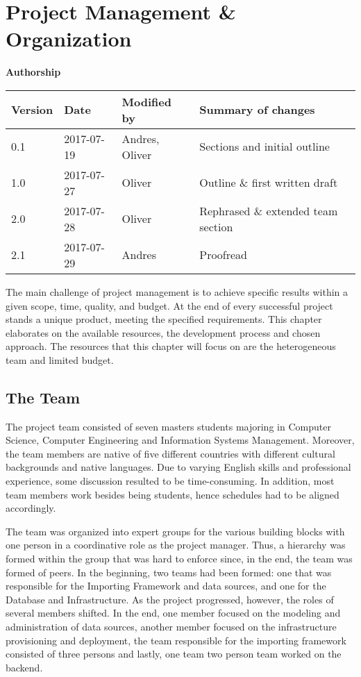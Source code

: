 \section{Project Management \& Organization}\label{sec:organization}

\textbf{Authorship}

\begin{longtable}[]{@{}llll@{}}
\toprule
Version & Date & Modified by & Summary of changes\tabularnewline
\midrule
\endhead
0.1 & 2017-07-19 & Andres, Oliver & Sections and initial
outline\tabularnewline
1.0 & 2017-07-27 & Oliver & Outline \& first written
draft\tabularnewline
2.0 & 2017-07-28 & Oliver & Rephrased \& extended team
section\tabularnewline
2.1 & 2017-07-29 & Andres & Proofread\tabularnewline
\bottomrule
\end{longtable}

The main challenge of project management is to achieve specific results
within a given scope, time, quality, and budget. At the end of every
successful project stands a unique product, meeting the specified
requirements. This chapter elaborates on the available resources, the
development process and chosen approach. The resources that this chapter
will focus on are the heterogeneous team and limited budget.

\subsection{The Team}\label{the-team}

The project team consisted of seven masters students majoring in
Computer Science, Computer Engineering and Information Systems
Management. Moreover, the team members are native of five different
countries with different cultural backgrounds and native languages. Due
to varying English skills and professional experience, some discussion
resulted to be time-consuming. In addition, most team members work besides
being students, hence schedules had to be aligned accordingly.

The team was organized into expert groups for the various building
blocks with one person in a coordinative role as the project manager.
Thus, a hierarchy was formed within the group that was hard to enforce
since, in the end, the team was formed of peers. In the beginning, two
teams had been formed: one that was responsible for the Importing
Framework and data sources, and one for the Database and Infrastructure.
As the project progressed, however, the roles of several members shifted. In
the end, one member focused on the modeling and administration of data
sources, another member focused on the infrastructure provisioning and
deployment, the team responsible for the importing framework consisted
of three persons and lastly, one team two person team worked on the
backend.

